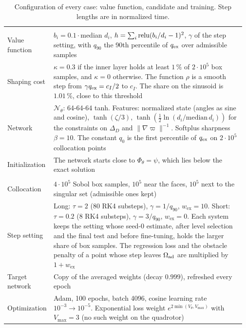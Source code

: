 \begin{table}[t]
\centering\footnotesize\renewcommand{\arraystretch}{1.1}
\caption{Configuration of every case: value function, candidate and training. Step lengths are in normalized time.}
\label{tab:config}
\begin{tabular}{@{}>{\raggedright\arraybackslash}p{0.16\linewidth}>{\raggedright\arraybackslash}p{0.81\linewidth}@{}}
\toprule
\multicolumn{2}{@{}l}{\textit{Value function and candidate}}\\
Value function & $b_i=0.1\cdot$median $d_i$, $h=\sum_i\operatorname{relu}(b_i/d_i-1)^2$, $\gamma$ of the step setting, with $q_{90}$ the 90th percentile of $q_{\mathrm{ex}}$ over admissible samples\\
Shaping cost & $\kappa=0.3$ if the inner layer holds at least $1\,\%$ of $2\cdot10^5$ box samples, and $\kappa=0$ otherwise. The function $\rho$ is a smooth step from $\gamma q_{\mathrm{ex}}=c_I/2$ to $c_I$. The share on the sinusoid is $1.01\,\%$, close to this threshold\\
Network & $\mathcal N_\theta$: 64-64-64 tanh. Features: normalized state (angles as sine and cosine), $\tanh(\zeta/3)$, $\tanh(\tfrac12\ln(d_i/\mathrm{median}\,d_i))$ for the constraints on $\Delta_D$ and $\|\nabla\varpi\|^{-1}$. Softplus sharpness $\beta=10$. The constant $q_0$ is the first percentile of $q_{\mathrm{ex}}$ on $2\cdot10^5$ collocation points\\
Initialization & The network starts close to $\Phi_\theta=\psi$, which lies below the exact solution\\
\midrule
\multicolumn{2}{@{}l}{\textit{Training}}\\
Collocation & $4\cdot10^5$ Sobol box samples, $10^5$ near the faces, $10^5$ next to the singular set (admissible ones kept)\\
Step setting & Long: $\tau=2$ (80 RK4 substeps), $\gamma=1/q_{90}$, $w_{\mathrm{ex}}=10$. Short: $\tau=0.2$ (8 RK4 substeps), $\gamma=3/q_{90}$, $w_{\mathrm{ex}}=0$. Each system keeps the setting whose seed-0 estimate, after level selection and the final test and before fine-tuning, holds the larger share of box samples. The regression loss and the obstacle penalty of a point whose step leaves $\Omega_{\mathrm{ad}}$ are multiplied by $1+w_{\mathrm{ex}}$\\
Target network & Copy of the averaged weights (decay $0.999$), refreshed every epoch\\
Optimization & Adam, 100 epochs, batch 4096, cosine learning rate $10^{-3}\to10^{-5}$. Exponential loss weight $e^{2\min(V_\theta,V_{\max})}$ with $V_{\max}=3$ (no such weight on the quadrotor)\\

\end{tabular}
\end{table}
